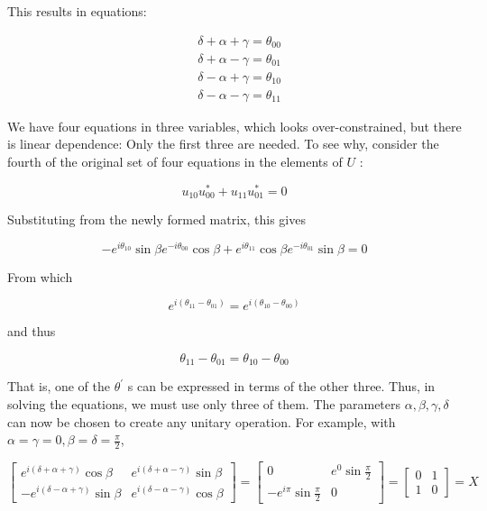 \documentclass[main.tex]{subfiles}
\begin{document}
    This results in equations:
    
    $$
    \begin{aligned}
    &\delta+\alpha+\gamma=\theta_{00} \\
    &\delta+\alpha-\gamma=\theta_{01} \\
    &\delta-\alpha+\gamma=\theta_{10} \\
    &\delta-\alpha-\gamma=\theta_{11}
    \end{aligned}
    $$
    
    We have four equations in three variables, which looks over-constrained, but there is linear dependence: Only the first three are needed. To see why, consider the fourth of the original set of four equations in the elements of $U$ :
    
    $$
    u_{10} u_{00}^{*}+u_{11} u_{01}^{*}=0
    $$
    
    Substituting from the newly formed matrix, this gives
    
    $$
    -e^{i \theta_{10}} \sin \beta e^{-i \theta_{00}} \cos \beta+e^{i \theta_{11}} \cos \beta e^{-i \theta_{01}} \sin \beta=0
    $$
    
    From which
    
    $$
    e^{i\left(\theta_{11}-\theta_{01}\right)}=e^{i\left(\theta_{10}-\theta_{00}\right)}
    $$
    
    and thus
    
    $$
    \theta_{11}-\theta_{01}=\theta_{10}-\theta_{00}
    $$
    
    That is, one of the $\theta^{\prime}$ s can be expressed in terms of the other three. Thus, in solving the equations, we must use only three of them. The parameters $\alpha, \beta, \gamma, \delta$ can now be chosen to create any unitary operation. For example, with $\alpha=\gamma=0, \beta=\delta=\frac{\pi}{2}$,
    
    $$
    \left[\begin{array}{cc}
    e^{i(\delta+\alpha+\gamma)} \cos \beta & e^{i(\delta+\alpha-\gamma)} \sin \beta \\
    -e^{i(\delta-\alpha+\gamma)} \sin \beta & e^{i(\delta-\alpha-\gamma)} \cos \beta
    \end{array}\right]=\left[\begin{array}{cc}
    0 & e^{0} \sin \frac{\pi}{2} \\
    -e^{i \pi} \sin \frac{\pi}{2} & 0
    \end{array}\right]=\left[\begin{array}{ll}
    0 & 1 \\
    1 & 0
    \end{array}\right]=X
    $$
    
\end{document}
